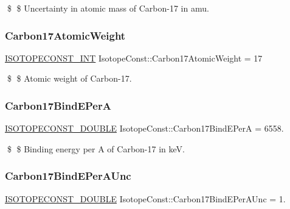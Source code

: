\$ \$ Uncertainty in atomic mass of Carbon-\/17 in amu. \mbox{\label{group___isotope_const-_carbon-_c17_ga5ecbe0190299e73cfc94030931c5e8c1}} 
\subsubsection{\texorpdfstring{Carbon17\+Atomic\+Weight}{Carbon17AtomicWeight}}
{\footnotesize\ttfamily \mbox{\hyperlink{group___isotope_const-_macros_ga5f18360b3e99483a35c32d789e62621c}{I\+S\+O\+T\+O\+P\+E\+C\+O\+N\+S\+T\+\_\+\+I\+NT}} Isotope\+Const\+::\+Carbon17\+Atomic\+Weight = 17}

\$ \$ Atomic weight of Carbon-\/17. \mbox{\label{group___isotope_const-_carbon-_c17_gada666fd1f18bc2a701be1a83166eba4d}} 
\subsubsection{\texorpdfstring{Carbon17\+Bind\+E\+PerA}{Carbon17BindEPerA}}
{\footnotesize\ttfamily \mbox{\hyperlink{group___isotope_const-_macros_ga8f45a7272ce02c0b4c65c44636ed719a}{I\+S\+O\+T\+O\+P\+E\+C\+O\+N\+S\+T\+\_\+\+D\+O\+U\+B\+LE}} Isotope\+Const\+::\+Carbon17\+Bind\+E\+PerA = 6558.}

\$ \$ Binding energy per A of Carbon-\/17 in keV. \mbox{\label{group___isotope_const-_carbon-_c17_gab14fa0f4f4b7e9bcef0b5f0fb65732f0}} 
\subsubsection{\texorpdfstring{Carbon17\+Bind\+E\+Per\+A\+Unc}{Carbon17BindEPerAUnc}}
{\footnotesize\ttfamily \mbox{\hyperlink{group___isotope_const-_macros_ga8f45a7272ce02c0b4c65c44636ed719a}{I\+S\+O\+T\+O\+P\+E\+C\+O\+N\+S\+T\+\_\+\+D\+O\+U\+B\+LE}} Isotope\+Const\+::\+Carbon17\+Bind\+E\+Per\+A\+Unc = 1.}

